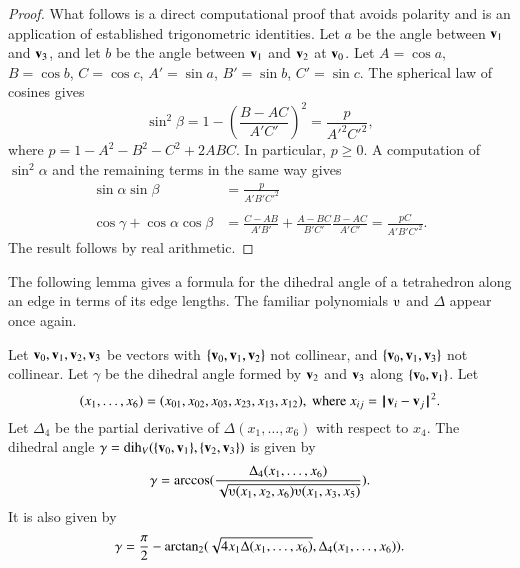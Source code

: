 \begin{proof}  
  What follows is a direct computational proof that avoids polarity and
is an
  application of established trigonometric identities.  Let $a$ be the
  angle between ${\mathbf v}_1$ and ${\mathbf v}_3$, and let $b$ be the angle between ${\mathbf v}_1$
  and ${\mathbf v}_2$ at ${\mathbf v}_0$.  Let $A=\cos a$, $B=\cos b$, $C=\cos c$,
  $A'=\sin a$, $B'=\sin b$, $C'=\sin c$.  The spherical
  law of cosines gives
\[ \sin^2\beta = 1-\left(\frac{B-A C}{A' C'}\right)^2
  = \frac{p}{A'^2 C'^2},\] 
where $p=1-A^2 - B^2 - C^2 + 2 A B C$.
In particular, $p\ge 0$.
%
A computation of $\sin^2\alpha$ and the remaining terms in the same way gives
\begin{align*}
  \sin\alpha\sin\beta &= \frac{\displaystyle p}{\displaystyle A' B' C'^2}\\ 
  \\
  \cos\gamma + \cos\alpha \cos\beta &=
  \frac{\displaystyle C - A B}{\displaystyle A' B'} + 
\frac{\displaystyle A - B C}{\displaystyle B' C'} 
\frac{\displaystyle B - A C}{\displaystyle A' C'}
  = \frac{\displaystyle p C}{\displaystyle A' B' C'^2}.
\end{align*}
The result follows by real arithmetic.
\end{proof}

The following lemma gives a formula for the dihedral angle
of a tetrahedron along an edge in terms of its edge lengths.  The
familiar polynomials $\ups$ and $\Delta$ appear once again.
%
%


\begin{lemma}[]\label{lemma:dihform}
Let ${\mathbf v}_0,{\mathbf v}_1,{\mathbf v}_2,{\mathbf v}_3$ 
be vectors with $\{{\mathbf v}_0,{\mathbf v}_1,{\mathbf v}_2\}$ not collinear, 
and $\{{\mathbf v}_0,{\mathbf v}_1,{\mathbf v}_3\}$ not
collinear. 
Let $\gamma$ be the dihedral angle formed
by ${\mathbf v}_2$ and ${\mathbf v}_3$ along $\{{\mathbf v}_0,{\mathbf v}_1\}$. Let
\[ (x_1,\ldots,x_6) = 
(x_{01},x_{02},x_{03},x_{23},x_{13},x_{12}),
\text{ where } x_{ij}=\norm{\v_i}{\v_j}^2.\] 
Let $\Delta_4$ be the partial derivative of $\Delta(x_1,\ldots,x_6)$ with
respect to $x_4$.
The dihedral angle $\gamma=\operatorname{dih}_V(\{{\mathbf v}_0,{\mathbf v}_1\},\{{\mathbf v}_2,{\mathbf v}_3\})$
is given by
\[ 
\gamma=\arccos(\frac{\Delta_4(x_1,\ldots,x_6)}{\sqrt{
\ups(x_1,x_2,x_6)\ups(x_1,x_3,x_5)}}).
\] 
It is also given by
\[ 
\gamma=\frac{\pi}{2} - {\operatorname{arctan_2}}
({\sqrt{4 x_1 \Delta(x_1,\ldots,x_6)}},{\Delta_4(x_1,\ldots,x_6)}).
\] 
\end{lemma}
%



